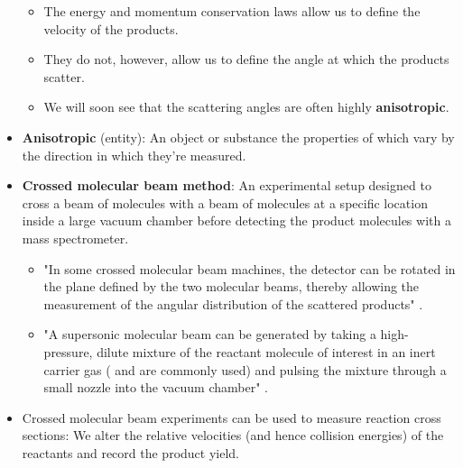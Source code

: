 \documentclass[../notes.tex]{subfiles}
\begin{document}
\begin{itemize}
\begin{itemize}
        \item The energy and momentum conservation laws allow us to define the velocity of the products.
        \item They do not, however, allow us to define the angle at which the products scatter.
        \item We will soon see that the scattering angles are often highly \textbf{anisotropic}.
    \end{itemize}
    \item \textbf{Anisotropic} (entity): An object or substance the properties of which vary by the direction in which they're measured.
    \item \textbf{Crossed molecular beam method}: An experimental setup designed to cross a beam of  molecules with a beam of  molecules at a specific location inside a large vacuum chamber before detecting the product molecules with a mass spectrometer.
    \begin{itemize}
        \item "In some crossed molecular beam machines, the detector can be rotated in the plane defined by the two molecular beams, thereby allowing the measurement of the angular distribution of the scattered products" \parencite[1244]{bib:McQuarrieSimon}.
        \item "A supersonic molecular beam can be generated by taking a high-pressure, dilute mixture of the reactant molecule of interest in an inert carrier gas ( and  are commonly used) and pulsing the mixture through a small nozzle into the vacuum chamber" \parencite[1244]{bib:McQuarrieSimon}.
    \end{itemize}
    \item Crossed molecular beam experiments can be used to measure reaction cross sections: We alter the relative velocities (and hence collision energies) of the reactants and record the product yield.
\end{itemize}
\end{document}
